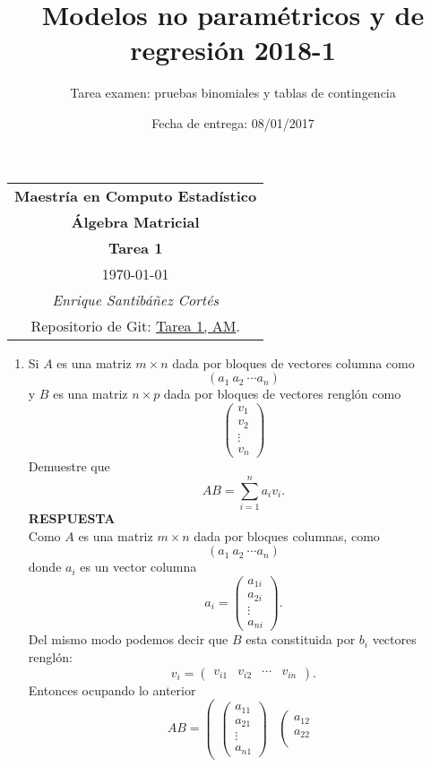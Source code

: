 \documentclass[11pt,letterpaper]{article}
\title{Modelos no paramétricos y de regresión 2018-1}
\author{Tarea examen: pruebas binomiales y tablas de contingencia}
\date{Fecha de entrega: 08/01/2017}
\newcommand{\res}{\textbf{RESPUESTA}\\}
\begin{document}
\begin{table}[ht]
\centering
\begin{tabular}{c}
\textbf{Maestría en Computo Estadístico}\\
\textbf{Álgebra Matricial} \\
\textbf{Tarea 1}\\
\today \\
\emph{Enrique Santibáñez Cortés}\\
Repositorio de Git: \href{https://github.com/Enriquesec/Algebra_matricial/tree/feature/tareas/tareas/Tarea_1}{Tarea 1, AM}.
\end{tabular}
\end{table}

\begin{enumerate}
\item Si $A$ es una matriz $m\times n$ dada por bloques de vectores columna como $$ (a_1\ a_2\ \cdots a_n)$$ y $B$ es una matriz $n\times p$ dada por bloques de vectores renglón como
\begin{equation*}
\left(\begin{array}{c}
v_1\\
v_2\\
\vdots \\
v_n
\end{array}
\right)
\end{equation*}
Demuestre que $$AB=\sum_{i=1}^na_iv_i.$$
\res
Como $A$ es una matriz $m\times n$ dada por bloques columnas, como
$$(a_1\ a_2\ \cdots a_n)$$
donde $a_i$ es un vector columna 
$$a_i=\left( \begin{array}{c}
a_{1i}\\
a_{2i}\\
\vdots\\
a_{ni}
\end{array}\right).$$
Del mismo modo podemos decir que $B$ esta constituida por $b_i$ vectores renglón:
$$v_i=(\begin{array}{cccc}
v_{i1} & v_{i2} & \cdots &v_{in}
\end{array} ).$$
Entonces ocupando lo anterior
$$AB=\left( \begin{array}{cccc}
\left( \begin{array}{c}
a_{11}\\
a_{21}\\
\vdots\\
a_{n1}
\end{array}\right) & 
\left( \begin{array}{c}
a_{12}\\
a_{22}\\

\end{array}
\end{array}$$
\end{enumerate}
\end{document}

